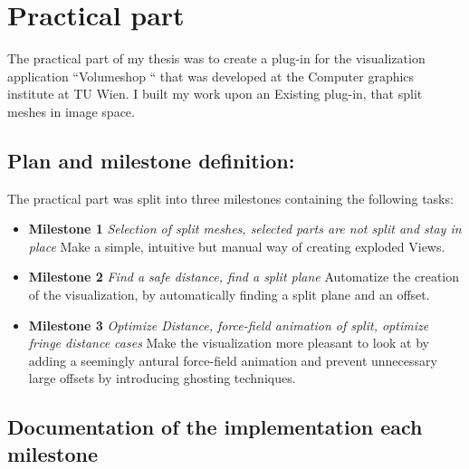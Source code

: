 \chapter{Practical part}
The practical part of my thesis was to create a plug-in for the visualization application ``Volumeshop `` that was developed at the Computer graphics institute at TU Wien. I built my work upon an Existing plug-in, that split meshes in image space.
\section{Plan and milestone definition:}
The practical part was split into three milestones containing the following tasks:
\begin{itemize}
\item \textbf{Milestone 1} \emph{Selection of split meshes, selected parts are not split and stay in place} Make a simple, intuitive but manual way of creating exploded Views.
\item \textbf{Milestone 2} \emph{Find a safe distance, find a split plane} Automatize the creation of the visualization, by automatically finding a split plane and an offset.
\item \textbf{Milestone 3} \emph{Optimize Distance, force-field animation of split, optimize fringe distance cases} Make the visualization more pleasant to look at by adding a seemingly antural force-field animation and prevent unnecessary large offsets by introducing ghosting techniques.
\end{itemize}
\section{Documentation of the implementation each milestone}

